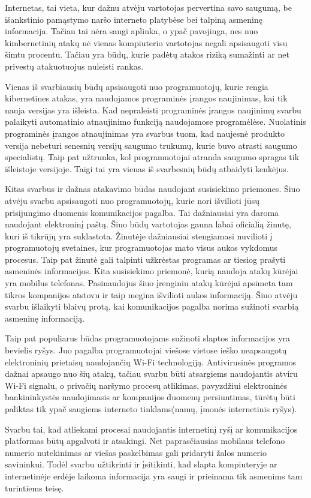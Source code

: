 Internetas, tai vieta, kur dažnu atvėju vartotojas pervertina savo saugumą, be išankstinio pamąstymo naršo interneto platybėse bei talpiną asmeninę informacija. Tačiau tai nėra saugi aplinka, o ypač pavojinga, nes nuo kimbernetinių atakų nė vienas kompiuterio vartotojas negali apsisaugoti visu šimtu procentu. Tačiau yra būdų, kurie padėtų atakos riziką sumažinti ar net privestų atakuotuojus nuleisti rankas.

Vienas iš svarbiausių būdų apsisaugoti nuo programuotojų, kurie rengia kibernetines atakas, yra naudojamos programinės įrangos naujinimas, kai tik nauja versijas yra išleista. Kad nepraleisti programinės įrangos naujinimų svarbu palaikyti automatinio atnaujinimo funkciją naudojamose programėlėse. Nuolatinis programinės įrangos atnaujinimas yra svarbus tuom, kad naujesnė produkto versija nebeturi senesnių versijų saugumo trukumų, kurie buvo atrasti saugumo specialistų. Taip pat užtrunka, kol programuotojai atranda saugumo spragas tik išleistoje versijoje. Taigi tai yra vienas iš svarbesnių būdų atbaidyti kenkėjus.

Kitas svarbus ir dažnas atakavimo būdas naudojant susisiekimo priemones. Šiuo atvėju svarbu apsisaugoti nuo programuotojų, kurie nori išvilioti jūsų prisijungimo duomenis komunikacijos pagalba. Tai dažniausiai yra daroma naudojant elektroninį paštą. Šiuo būdų vartotojas gauna labai oficialią žinutę, kuri iš tikrūjų yra suklastota. Žinutėje dažniausiai stengiamasi nuvilioti į programuotojų svetaines, kur programuotojas mato visus aukos vykdomus procesus. Taip pat žinutė gali talpinti užkrėstas programas ar tiesiog prašyti asmeninės informacijos. Kita susisiekimo priemonė, kurią naudoja atakų kūrėjai yra mobilus telefonas. Pasinaudojus šiuo įrenginiu atakų kūrėjai apsimeta tam tikros kompanijos atstovu ir taip megina išvilioti aukos informaciją. Šiuo atvėju svarbu išlaikyti blaivų protą, kai komunikacijos pagalba norima sužinoti svarbią asmeninę informaciją.

Taip pat populiarus būdas programuotojams sužinoti slaptos informacijos yra bevielis ryšys. Juo pagalba programuotojai viešose vietose ieško neapsaugotų elektroninių prietaisų naudojančių Wi-Fi technologiją. Antivirusinės programos dažnai apsaugo nuo šių atakų, tačiau svarbu būti atsargiems naudojantis atviru Wi-Fi signalu, o privačių naršymo procesų atlikimas, pavyzdžiui elektroninės bankininkystės naudojimasis ar kompanijos duomenų persiuntimas, tūrėtų būti paliktas tik ypač saugiems interneto tinklams(namų, įmonės internetinis ryšys).

Svarbu tai, kad atliekami procesai naudojantis internetinį ryšį ar komunikacijos platformas būtų apgalvoti ir atsakingi. Net paprasčiausias mobilaus telefono numerio nutekinimas ar viešas paskelbimas gali pridaryti žalos numerio savininkui. Todėl svarbu užtikrinti ir įsitikinti, kad slapta kompiuteryje ar internetinėje erdėje laikoma informacija yra saugi ir prieinama tik asmenims tam turintiems teisę.   
